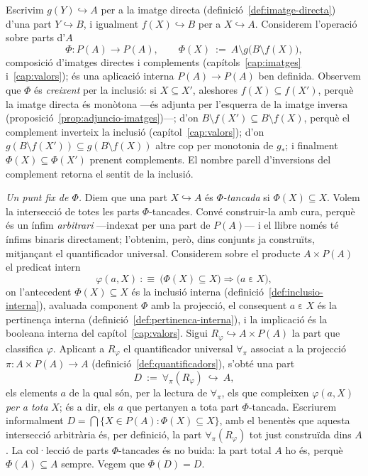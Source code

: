 \begin{prova}
Escrivim \(g(Y)\hookrightarrow A\) per a la imatge directa
(definició~\ref{def:imatge-directa}) d'una part \(Y\hookrightarrow B\), i
igualment \(f(X)\hookrightarrow B\) per a \(X\hookrightarrow A\). Considerem
l'operació sobre parts d'\(A\)
\[
\Phi\colon P(A)\longrightarrow P(A),
\qquad
\Phi(X)\ :=\ A\setminus g\bigl(B\setminus f(X)\bigr),
\]
composició d'imatges directes i complements
(capítols~\ref{cap:imatges} i~\ref{cap:valors}); és una aplicació interna
\(P(A)\to P(A)\) ben definida. Observem que \(\Phi\) és \emph{creixent} per
la inclusió: si \(X\subseteq X'\), aleshores \(f(X)\subseteq f(X')\), perquè
la imatge directa és monòtona ---és adjunta per l'esquerra de la imatge
inversa (proposició~\ref{prop:adjuncio-imatges})---; d'on \(B\setminus
f(X')\subseteq B\setminus f(X)\), perquè el complement inverteix la inclusió
(capítol~\ref{cap:valors}); d'on \(g(B\setminus f(X'))\subseteq g(B\setminus
f(X))\) altre cop per monotonia de \(g_{*}\); i finalment \(\Phi(X)\subseteq
\Phi(X')\) prenent complements. El nombre parell d'inversions del complement
retorna el sentit de la inclusió.

\emph{Un punt fix de \(\Phi\).} Diem que una part \(X\hookrightarrow A\) és
\emph{\(\Phi\)-tancada} si \(\Phi(X)\subseteq X\). Volem la intersecció de
totes les parts \(\Phi\)-tancades. Convé construir-la amb cura, perquè és un
ínfim \emph{arbitrari} ---indexat per una part de \(P(A)\)--- i el llibre
només té ínfims binaris directament; l'obtenim, però, dins conjunts ja
construïts, mitjançant el quantificador universal. Considerem sobre el
producte \(A\times P(A)\) el predicat intern
\[
\varphi(a,X)\ :\equiv\ \bigl(\Phi(X)\subseteq X\bigr)\Rightarrow
\bigl(a\mathrel{\varepsilon} X\bigr),
\]
on l'antecedent \(\Phi(X)\subseteq X\) és la inclusió interna
(definició~\ref{def:inclusio-interna}), avaluada component \(\Phi\) amb la
projecció, el consequent \(a\mathrel{\varepsilon} X\) és la pertinença
interna (definició~\ref{def:pertinenca-interna}), i la implicació és la
booleana interna del capítol~\ref{cap:valors}. Sigui
\(R_\varphi\hookrightarrow A\times P(A)\) la part que classifica \(\varphi\).
Aplicant a \(R_\varphi\) el quantificador universal \(\forall_{\pi}\) associat
a la projecció \(\pi\colon A\times P(A)\to A\)
(definició~\ref{def:quantificadors}), s'obté una part
\[
D\ :=\ \forall_{\pi}(R_\varphi)\ \hookrightarrow\ A,
\]
els elements \(a\) de la qual són, per la lectura de \(\forall_{\pi}\), els
que compleixen \(\varphi(a,X)\) \emph{per a tota} \(X\); és a dir, els \(a\)
que pertanyen a tota part \(\Phi\)-tancada. Escriurem informalment
\(D=\bigcap\{X\in P(A):\Phi(X)\subseteq X\}\), amb el benentès que aquesta
intersecció arbitrària és, per definició, la part \(\forall_{\pi}(R_\varphi)\)
tot just construïda dins \(A\). La col·lecció de parts \(\Phi\)-tancades és
no buida: la part total \(A\) ho és, perquè \(\Phi(A)\subseteq A\) sempre.
Vegem que \(\Phi(D)=D\).


\end{prova}
